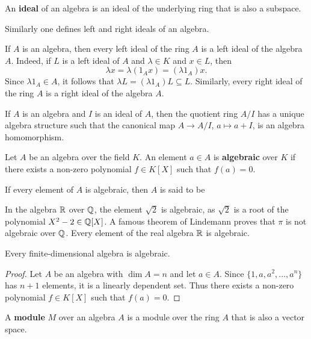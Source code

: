 \begin{definition}
 	An \textbf{ideal} of an algebra is an ideal of the underlying ring that is also a subspace.
\end{definition}

Similarly one defines left and right ideals of an algebra.

If $A$ is an algebra, then every left ideal of the ring $A$ is a left ideal of the algebra $A$. 
Indeed, if $L$ is a left ideal of $A$ 
and $\lambda\in K$ and $x\in L$, then 
\[
	\lambda x=\lambda (1_Ax)=(\lambda 1_A)x.
\]
Since $\lambda 1_A\in A$, it follows that  $\lambda L=(\lambda
1_A)L\subseteq L$. Similarly, every right ideal of the ring $A$ is a right ideal of the algebra $A$.

If $A$ is an algebra and $I$ is an ideal of $A$, then the quotient ring $A/I$ has a unique algebra
structure such that the canonical map  
$A\to A/I$, $a\mapsto a+I$, is an algebra homomorphism. 

\begin{definition}
    Let $A$ be an algebra over the field $K$. An element $a\in A$ is 
    \textbf{algebraic} over $K$ if there exists a non-zero polynomial $f\in K[X]$
    such that $f(a)=0$. 
\end{definition}

If every element of $A$ is algebraic, then $A$ is said to be  

In the algebra $\mathbb{R}$ over $\mathbb{Q}$, the element $\sqrt{2}$ is algebraic, as $\sqrt{2}$ is a root of the polynomial $X^2-2\in\mathbb{Q}[X]$. A famous theorem of Lindemann proves that $\pi$ is not algebraic over $\mathbb{Q}$. Every element of the real algebra $\mathbb{R}$ is algebraic.

\begin{proposition}
	\label{lem:algebraic}
	Every finite-dimensional algebra is algebraic.
\end{proposition}

\begin{proof}
   Let $A$ be an algebra with $\dim A=n$ and let $a\in A$. Since  
	$\{1,a,a^2,\dots,a^n\}$ has $n+1$ elements, it is a linearly dependent set. Thus there exists 
	a non-zero polynomial $f\in K[X]$ such that $f(a)=0$.
\end{proof}

\begin{definition}
    A \textbf{module} $M$ over an algebra $A$ is a module over the ring $A$ that is also a vector space. 
\end{definition}

